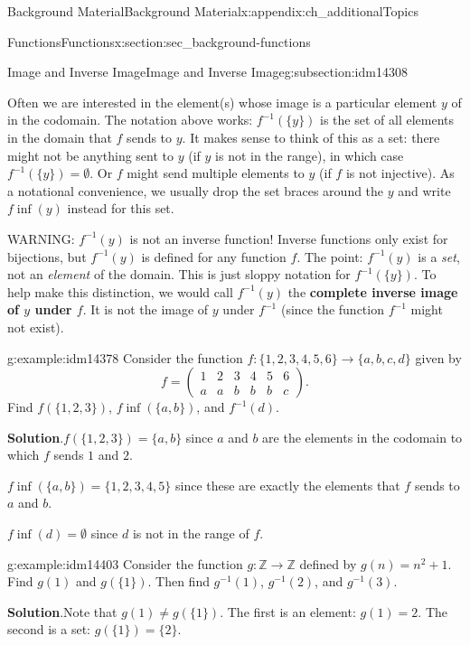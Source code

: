 \documentclass[oneside,10pt,]{book}
\newcommand{\terminology}[1]{\textbf{#1}}
\numberwithin{equation}{chapter}
\def\Z{\mathbb Z}
\def\inv{^{-1}}
\newcommand{\amp}{&}
\begin{document}
\begin{appendixptx}{Background Material}{}{Background Material}{}{}{x:appendix:ch_additionalTopics}
\begin{sectionptx}{Functions}{}{Functions}{}{}{x:section:sec_background-functions}
\begin{subsectionptx}{Image and Inverse Image}{}{Image and Inverse Image}{}{}{g:subsection:idm14308}
\par
Often we are interested in the element(s) whose image is a particular element \(y\) of in the codomain.  The notation above works: \(f\inv(\{y\})\) is the set of all elements in the domain that \(f\) sends to \(y\).  It makes sense to think of this as a set: there might not be anything sent to \(y\) (if \(y\) is not in the range), in which case \(f\inv(\{y\}) = \emptyset\).  Or \(f\) might send multiple elements to \(y\) (if \(f\) is not injective).  As a notational convenience, we usually drop the set braces around the \(y\) and write \(f\inf(y)\) instead for this set.%
\par
WARNING: \(f\inv(y)\) is not an inverse function! Inverse functions only exist for bijections, but \(f\inv(y)\) is defined for any function \(f\). The point: \(f\inv(y)\) is a \emph{set}, not an \emph{element} of the domain.  This is just sloppy notation for \(f\inv(\{y\})\).  To help make this distinction, we would call \(f\inv(y)\) the \terminology{complete inverse image of \(y\) under \(f\)}.  It is not the image of \(y\) under \(f\inv\) (since the function \(f\inv\) might not exist).%
\begin{example}{}{g:example:idm14378}%
Consider the function \(f:\{1,2,3,4,5,6\} \to \{a,b,c,d\}\) given by%
\begin{equation*}
f = \begin{pmatrix}1 \amp 2 \amp 3 \amp 4 \amp 5 \amp 6 \\ a \amp a \amp b \amp b \amp b \amp c\end{pmatrix}.
\end{equation*}
Find \(f(\{1,2,3\})\),  \(f\inf(\{a,b\})\), and \(f\inv(d)\).%
\par\smallskip%
\noindent\textbf{Solution}.\hypertarget{g:solution:idm14386}{}\quad{}\(f(\{1,2,3\}) = \{a,b\}\) since \(a\) and \(b\) are the elements in the codomain to which \(f\) sends \(1\) and \(2\).%
\par
\(f\inf(\{a,b\}) = \{1,2,3,4,5\}\) since these are exactly the elements that \(f\) sends to \(a\) and \(b\).%
\par
\(f\inf(d) = \emptyset\) since \(d\) is not in the range of \(f\).%
\end{example}
\begin{example}{}{g:example:idm14403}%
Consider the function \(g:\Z \to \Z\) defined by \(g(n) = n^2 + 1\). Find \(g(1)\) and \(g(\{1\})\).  Then find \(g\inv(1)\), \(g\inv(2)\), and \(g\inv(3)\).%
\par\smallskip%
\noindent\textbf{Solution}.\hypertarget{g:solution:idm14413}{}\quad{}Note that \(g(1) \ne g(\{1\})\).  The first is an element: \(g(1) = 2\).  The second is a set: \(g(\{1\}) = \{2\}\).%

\end{example}
\end{subsectionptx}
\end{sectionptx}
\end{appendixptx}
\end{document}
